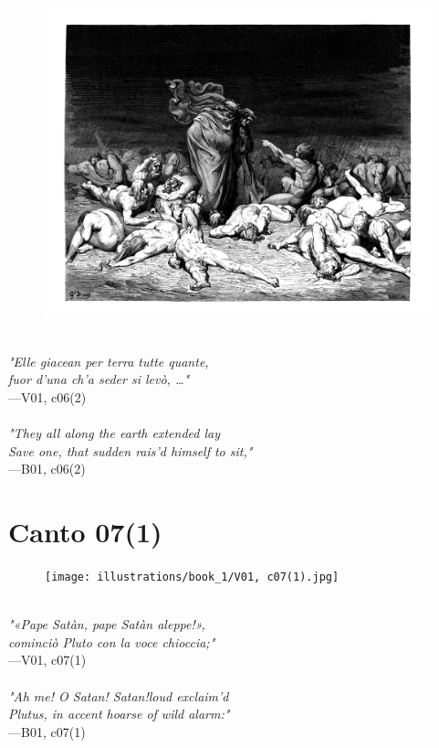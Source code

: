 \documentclass[../Dore_vision.tex]{subfiles}
\begin{document}
\begin{figure}[ht]
\centering
\includegraphics[height=\figsize]{illustrations/book_1/V01, c06(2).jpg}
\end{figure}

\begin{center}
\begin{minipage}{0.8\linewidth}
\textit{\\
"Elle giacean per terra tutte quante,\\fuor d’una ch’a seder si lev\`o, …"} \\
—V01, c06(2) \\~\\
\textit{"They all along the earth extended lay\\Save one, that sudden rais'd himself to sit,"} \\
—B01, c06(2)
\end{minipage}
\end{center}

\newpage

\section{Canto 07(1)}

\begin{figure}[ht]
\centering
\texttt{[image: illustrations/book\_1/V01, c07(1).jpg]}
\end{figure}

\begin{center}
\begin{minipage}{0.8\linewidth}
\textit{\\
"«Pape Satàn, pape Satàn aleppe!»,\\cominci\`o Pluto con la voce chioccia;"} \\
—V01, c07(1) \\~\\
\textit{"\textquotesingle Ah me! O Satan! Satan!\textquotesingle \space loud exclaim'd\\Plutus, in accent hoarse of wild alarm:"} \\
—B01, c07(1)
\end{minipage}
\end{center}
\end{document}
